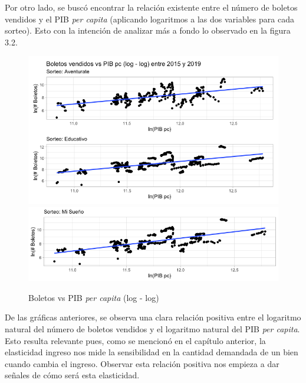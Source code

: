 Por otro lado, se buscó encontrar la relación existente entre el número de boletos vendidos y el PIB \textit{per capita} (aplicando logaritmos a las dos variables para cada sorteo). Esto con la intención de analizar más a fondo lo observado en la figura 3.2.

\begin{figure}[H]
    \caption{Boletos vs PIB \textit{per capita} (log - log)}
    \label{fig:scat}
    \includegraphics[scale = 0.35]{Imagenes/sc1.png}
    \centering
    \includegraphics[scale = 0.35]{Imagenes/sc2.png} \\
    \centering
\end{figure}

De las gráficas anteriores, se observa una clara relación positiva entre el logaritmo natural del número de boletos vendidos y el logaritmo natural del PIB \textit{per capita}. Esto resulta relevante pues, como se mencionó en el capítulo anterior, la elasticidad ingreso nos mide la sensibilidad en la cantidad demandada de un bien cuando cambia el ingreso. Observar esta relación positiva nos empieza a dar señales de cómo será esta elasticidad. \\


